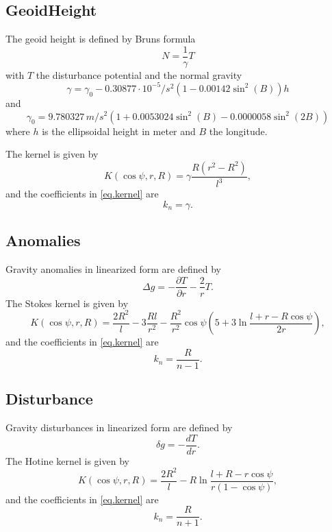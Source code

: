 \subsection{GeoidHeight}\label{kernelType:geoidHeight}
The geoid height is defined by Bruns formula
\begin{equation}
N = \frac{1}{\gamma}T
\end{equation}
with $T$ the disturbance potential and the normal gravity
\begin{equation}\label{normalgravity}
\gamma  = \gamma_0 - 0.30877\cdot 10^{-5}/s^2(1-0.00142\sin^2(B))h
\end{equation}
and
\begin{equation}
\gamma_0 = 9.780327\,m/s^2(1+0.0053024\sin^2(B)-0.0000058\sin^2(2B))
\end{equation}
where $h$ is the ellipsoidal height in meter and $B$ the longitude.

The kernel is given by
\begin{equation}
K(\cos\psi,r,R) = \gamma\frac{R(r^2-R^2)}{l^3},
\end{equation}
and the coefficients in \eqref{eq.kernel} are
\begin{equation}
k_n = \gamma.
\end{equation}


\subsection{Anomalies}
Gravity anomalies in linearized form are defined by
\begin{equation}
\Delta g = -\frac{\partial T}{\partial r}-\frac{2}{r}T.
\end{equation}
The Stokes kernel is given by
\begin{equation}
K(\cos\psi,r,R) = \frac{2R^2}{l}-3\frac{Rl}{r^2}-\frac{R^2}{r^2}\cos\psi
\left(5+3\ln\frac{l+r-R\cos\psi}{2r}\right),
\end{equation}
and the coefficients in \eqref{eq.kernel} are
\begin{equation}
k_n = \frac{R}{n-1}.
\end{equation}


\subsection{Disturbance}\label{kernelType:disturbance}
Gravity disturbances in linearized form are defined by
\begin{equation}
\delta g = -\frac{dT}{dr}.
\end{equation}
The Hotine kernel is given by
\begin{equation}
K(\cos\psi,r,R) = \frac{2R^2}{l}-R\ln\frac{l+R-r\cos\psi}{r(1-\cos\psi)},
\end{equation}
and the coefficients in \eqref{eq.kernel} are
\begin{equation}
k_n = \frac{R}{n+1}.
\end{equation}


